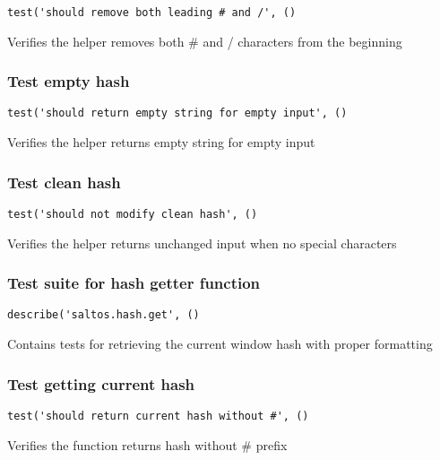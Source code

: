 \documentclass[a4paper]{article}
\begin{document}
\begin{lstlisting}
test('should remove both leading # and /', ()
\end{lstlisting}

Verifies the helper removes both \# and / characters from the beginning

\hypertarget{toc196}{}
\subsubsection{Test empty hash}

\begin{lstlisting}
test('should return empty string for empty input', ()
\end{lstlisting}

Verifies the helper returns empty string for empty input

\hypertarget{toc197}{}
\subsubsection{Test clean hash}

\begin{lstlisting}
test('should not modify clean hash', ()
\end{lstlisting}

Verifies the helper returns unchanged input when no special characters

\hypertarget{toc198}{}
\subsubsection{Test suite for hash getter function}

\begin{lstlisting}
describe('saltos.hash.get', ()
\end{lstlisting}

Contains tests for retrieving the current window hash
with proper formatting

\hypertarget{toc199}{}
\subsubsection{Test getting current hash}

\begin{lstlisting}
test('should return current hash without #', ()
\end{lstlisting}

Verifies the function returns hash without \# prefix

\hypertarget{toc200}{}
\end{document}
